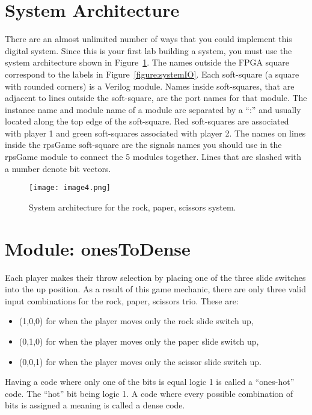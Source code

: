 \section{System Architecture}

There are an almost unlimited number of ways that you could implement
this digital system. Since this is your first lab building a system, you
must use the system architecture shown in Figure~\ref{fig:sysArch}. The names outside
the FPGA square correspond to the labels in Figure~\ref{figure:systemIO}. Each soft-square
(a square with rounded corners) is a Verilog module. Names inside
soft-squares, that are adjacent to lines outside the soft-square, are
the port names for that module. The instance name and module name of a
module are separated by a ``:'' and usually located along the top edge
of the soft-square. Red soft-squares are associated with player 1 and
green soft-squares associated with player 2. The names on lines inside
the rpsGame soft-square are the signals names you should use in the
rpsGame module to connect the 5 modules together. Lines that are slashed
with a number denote bit vectors.

\begin{figure}[ht]
\texttt{[image:  image4.png]}
\caption{System architecture for the rock, paper, scissors system.}
\label{fig:sysArch}
\end{figure}

\hypertarget{onestodense-module}{%
\section{Module: onesToDense}
\label{onestodense-module}}

Each player makes their throw selection by placing one of the three
slide switches into the up position. As a result of this game mechanic,
there are only three valid input combinations for the rock, paper,
scissors trio. These are:

\begin{itemize}
\item
  (1,0,0) for when the player moves only the rock slide switch up,
\item
  (0,1,0) for when the player moves only the paper slide switch up,
\item
  (0,0,1) for when the player moves only the scissor slide switch up.
\end{itemize}

Having a code where only one of the bits is equal logic 1 is called a
``ones-hot'' code. The ``hot'' bit being logic 1. A code where every
possible combination of bits is assigned a meaning is called a dense
code.

